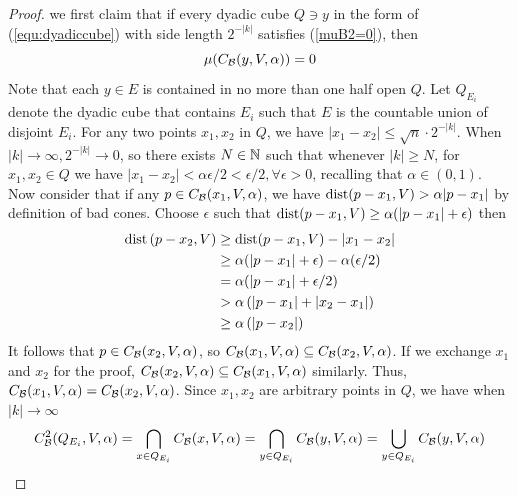 \begin{proof}
    we first claim that if every dyadic cube $Q\ni y$ in the form of (\ref{equ:dyadiccube}) with side length $2^{-|k|}$ satisfies (\ref{muB2=0}), 
    then
    \begin{equation}\label{muBx=0}
        \mu(C_\mathcal B(y, V, \alpha)) = 0
    \end{equation}
    Note that each $y\in E$ is contained in no more than one half open $Q$. Let $Q_{E_i}$ denote the dyadic cube that contains $E_i$ such that $E$ is the countable union of disjoint $E_i$. For any two points $x_1, x_2$ in $Q$, we have $|x_1-x_2|\leq \sqrt{n}\cdot 2^{-|k|}$. When $|k|\rightarrow \infty, 2^{-|k|}\rightarrow 0$, so there exists $N\in\mathbb{N}$ such that whenever $|k|\geq N$, for $x_1, x_2\in Q$ we have $|x_1-x_2|<\alpha\epsilon/2<\epsilon/2, \forall \epsilon >0$, recalling that $\alpha\in(0,1)$. Now consider that if any $p\in C_\mathcal B(x_1, V, \alpha)$, we have $\operatorname{dist}(p-x_1, V) > \alpha|p-x_1|$ by definition of bad cones. Choose $\epsilon$ such that $\operatorname{dist}(p-x_1, V) \geq \alpha (|p-x_1|+\epsilon)$ then
\begin{equation*}
    \begin{aligned} 
        \operatorname{dist}\left(p-x_{2}, V\right) & \geq \operatorname{dist}(p-x_1, V)-\left|x_1-x_2\right| \\ 
        & \geq \alpha(|p-x_1|+\epsilon)-\alpha(\epsilon / 2) \\ 
        & =\alpha(|p-x_1|+\epsilon / 2) \\ 
        & >\alpha\left(|p-x_1|+\left|x_2-x_1\right|\right) \\ 
        & \geq \alpha\left(\left|p-x_2\right|\right) 
\end{aligned}
\end{equation*}
It follows that $p\in C_{\mathcal B}(x_2, V, \alpha)$, so $ C_{\mathcal B}(x_1, V, \alpha)\subseteq C_{\mathcal B}(x_2, V, \alpha)$. If we exchange $x_1$ and $x_2$ for the proof, $ C_{\mathcal B}(x_2, V, \alpha)\subseteq C_{\mathcal B}(x_1, V, \alpha)$ similarly. Thus, $ C_{\mathcal B}(x_1, V, \alpha)=C_{\mathcal B}(x_2, V, \alpha)$. Since $x_1, x_2$ are arbitrary points in $Q$, we have when $|k|\rightarrow \infty$
\begin{equation}\label{CB2=CB1}
    \begin{split}
        C_\mathcal B^2(Q_{E_i}, V, \alpha) 
        = \bigcap_{x\in Q_{E_i}} C_\mathcal B(x, V, \alpha) 
        = \bigcap_{y\in Q_{E_i}} C_\mathcal B(y, V, \alpha)
        = \bigcup_{y\in Q_{E_i}}C_\mathcal B(y, V, \alpha) 
    \end{split}
\end{equation}

\end{proof}
